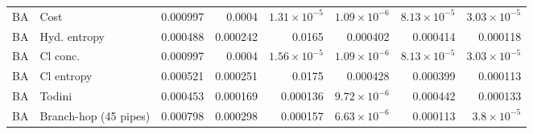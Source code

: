 \begin{table}[H]
{\begin{tabular}{llrrrrrr}
BA & Cost & 0.000997 & 0.0004 & $1.31\times10^{-5}$ & $1.09\times10^{-6}$ & $8.13\times10^{-5}$ & $3.03\times10^{-5}$ \\
BA & Hyd. entropy & 0.000488 & 0.000242 & 0.0165 & 0.000402 & 0.000414 & 0.000118 \\
BA & Cl conc. & 0.000997 & 0.0004 & $1.56\times10^{-5}$ & $1.09\times10^{-6}$ & $8.13\times10^{-5}$ & $3.03\times10^{-5}$ \\
BA & Cl entropy & 0.000521 & 0.000251 & 0.0175 & 0.000428 & 0.000399 & 0.000113 \\
BA & Todini & 0.000453 & 0.000169 & 0.000136 & $9.72\times10^{-6}$ & 0.000442 & 0.000133 \\
BA & Branch-hop (45 pipes) & 0.000798 & 0.000298 & 0.000157 & $6.63\times10^{-6}$ & 0.000113 & $3.8\times10^{-5}$ \\
\bottomrule
\end{tabular}}
\end{table}
